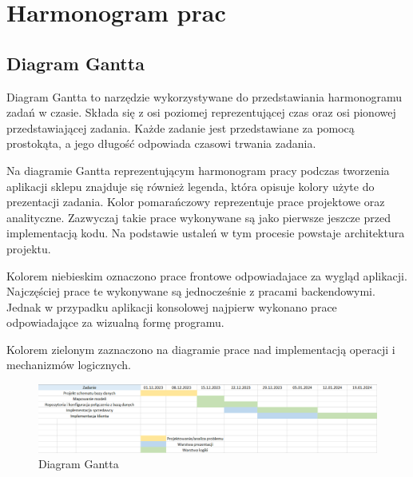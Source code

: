 ﻿\chapter{Harmonogram prac}
\section{Diagram Gantta}

Diagram Gantta to narzędzie wykorzystywane do przedstawiania harmonogramu zadań w czasie. Składa się z osi poziomej reprezentującej czas oraz osi pionowej przedstawiającej zadania. Każde zadanie jest przedstawiane za pomocą prostokąta, a jego długość odpowiada czasowi trwania zadania.\newline

Na diagramie Gantta reprezentującym harmonogram pracy podczas tworzenia aplikacji sklepu znajduje się również legenda, która opisuje kolory użyte do prezentacji zadania. Kolor pomarańczowy reprezentuje prace projektowe oraz analityczne. Zazwyczaj takie prace wykonywane są jako pierwsze jeszcze przed implementacją kodu. Na podstawie ustaleń w tym procesie powstaje architektura projektu.\newline

Kolorem niebieskim oznaczono prace frontowe odpowiadajace za wygląd aplikacji. Najczęściej prace te wykonywane są jednocześnie z pracami backendowymi. Jednak w przypadku aplikacji konsolowej najpierw wykonano prace odpowiadające za wizualną formę programu.\newline

Kolorem zielonym zaznaczono na diagramie prace nad implementacją operacji i mechanizmów logicznych.\newline

\begin{figure}[!ht]
	\centering
		\includegraphics[width=15cm]{gant.png}
	\caption{\footnotesize Diagram Gantta}
	\label{fig:plotend}
\end{figure}